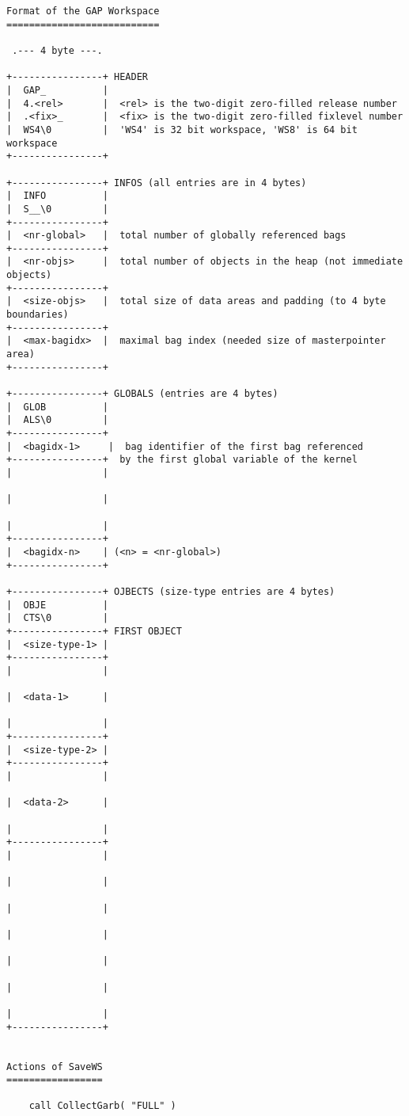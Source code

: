 \documentclass[11pt]{article}
\begin{document}
\begin{verbatim}
Format of the GAP Workspace
===========================

 .--- 4 byte ---.

+----------------+ HEADER
|  GAP_          |
|  4.<rel>       |  <rel> is the two-digit zero-filled release number
|  .<fix>_       |  <fix> is the two-digit zero-filled fixlevel number
|  WS4\0         |  'WS4' is 32 bit workspace, 'WS8' is 64 bit workspace
+----------------+

+----------------+ INFOS (all entries are in 4 bytes)
|  INFO          |
|  S__\0         |
+----------------+
|  <nr-global>   |  total number of globally referenced bags
+----------------+
|  <nr-objs>     |  total number of objects in the heap (not immediate objects)
+----------------+
|  <size-objs>   |  total size of data areas and padding (to 4 byte boundaries)
+----------------+
|  <max-bagidx>  |  maximal bag index (needed size of masterpointer area)
+----------------+

+----------------+ GLOBALS (entries are 4 bytes)
|  GLOB          |
|  ALS\0         |
+----------------+
|  <bagidx-1>     |  bag identifier of the first bag referenced
+----------------+  by the first global variable of the kernel
|                |

|                |

|                |
+----------------+
|  <bagidx-n>    | (<n> = <nr-global>)
+----------------+

+----------------+ OJBECTS (size-type entries are 4 bytes)
|  OBJE          |
|  CTS\0         |
+----------------+ FIRST OBJECT
|  <size-type-1> |
+----------------+
|                |

|  <data-1>      |

|                |
+----------------+
|  <size-type-2> |
+----------------+
|                |

|  <data-2>      |

|                |
+----------------+
|                |

|                |

|                |

|                |

|                |

|                |

|                |
+----------------+


Actions of SaveWS
=================

    call CollectGarb( "FULL" )


\end{verbatim}
\end{document}
